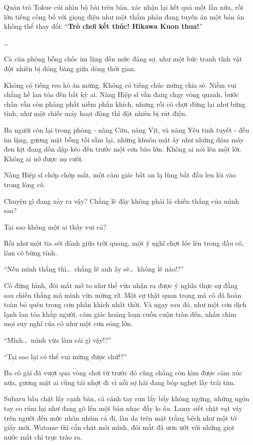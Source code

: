 \documentclass[../main.tex]{subfiles}
\begin{document}
Quản trò Tokue cúi nhìn bộ bài trên bàn, xác nhận lại kết quả một lần nữa, rồi lớn tiếng công bố với giọng điệu như một thẩm phán đang tuyên án một bản án không thể thay đổi: ``\textbf{Trò chơi kết thúc! Hikawa Kuon thua!}''

\dots

Cả căn phòng bỗng chốc im lặng đến mức đáng sợ, như một bức tranh tĩnh vật đột nhiên bị đóng băng giữa dòng thời gian.

Không có tiếng reo hò ăn mừng. Không có tiếng chúc mừng chia sẻ. Niềm vui chẳng hề lan tỏa đến bất kỳ ai. Nàng Hiệp sĩ vẫn đang chạy vòng quanh, bước chân vẫn còn phảng phất niềm phấn khích, nhưng rồi cô chợt đứng lại như bừng tỉnh, như một chiếc máy hoạt động thì đột nhiên bị rút điện.

Ba người còn lại trong phòng - nàng Cừu, nàng Vịt, và nàng Yêu tinh tuyết - đều im lặng, gương mặt bỗng tối sầm lại, những khuôn mặt ấy như những đám mây đen kịt đang dồn dập kéo đến trước một cơn bão lớn. Không ai nói lên một lời. Không ai nở được nụ cười.

Nàng Hiệp sĩ chớp chớp mắt, một cảm giác bất an lạ lùng bắt đầu len lỏi vào trong lòng cô.

Chuyện gì đang xảy ra vậy? Chẳng lẽ đây không phải là chiến thắng của mình sao?

Tại sao không một ai thấy vui cả?

Rồi như một tia sét đánh giữa trời quang, một ý nghĩ chợt lóe lên trong đầu cô, làm cô bừng tỉnh.

``Nếu mình thắng thì\dots\ chẳng lẽ anh ấy sẽ\dots\ không lẽ nào!?''

Cô đứng hình, đôi mắt mở to như thể vừa nhận ra được ý nghĩa thực sự đằng sau chiến thắng mà mình vừa mừng rỡ. Một sự thật quan trọng mà cô đã hoàn toàn bỏ quên trong cơn phấn khích nhất thời. Và ngay sau đó, như một cơn dịch lạnh lan tỏa khắp người, cảm giác hoảng loạn cuồn cuộn tràn đến, nhấn chìm mọi suy nghĩ của cô như một cơn sóng lớn.

``Mình\dots\ mình vừa làm cái gì vậy!?''

``Tại sao lại có thể vui mừng được chứ!?''

Ba cô gái đã vượt qua vòng chơi từ trước đó cũng chẳng còn kìm được cảm xúc nữa, gương mặt ai cũng tái nhợt đi vì nỗi sợ hãi đang bóp nghẹt lấy trái tim.

Subaru bấu chặt lấy cạnh bàn, cả cánh tay run lẩy bẩy không ngừng, những ngón tay co rúm lại như đang gõ lên một bản nhạc đầy lo âu. Lamy siết chặt vạt váy trên người đến mức nhăn nhúm cả đi, làn da trên mặt trắng bệch như một tờ giấy mới. Watame thì cắn chặt môi mình, đôi mắt đã ươn ướt với những giọt nước mắt chỉ trực trào ra.
\end{document}
